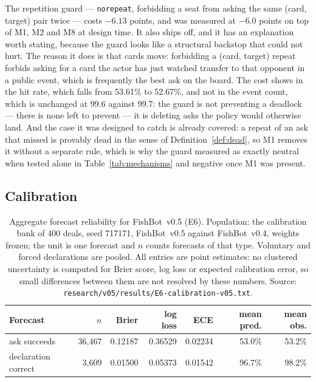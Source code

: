 \documentclass[11pt]{article}
\theoremstyle{definition}
\DeclareRobustCommand{\vfive}{\texorpdfstring{\mbox{FishBot v0.5}}{FishBot v0.5}}
\DeclareRobustCommand{\vfour}{\texorpdfstring{\mbox{FishBot v0.4}}{FishBot v0.4}}
\providecommand{\numCalibFiveDeals}{400}
\providecommand{\numCalibFiveSeed}{717171}
\providecommand{\numAblFullEvents}{99.7}
\providecommand{\numAblFullHit}{53.61}
\providecommand{\numAblRepeatGuardEvents}{99.6}
\providecommand{\numAblRepeatGuardHit}{52.67}
\providecommand{\numAblRepeatGuardDelta}{-6.13}
\providecommand{\numCalibAskBrier}{0.12187}
\providecommand{\numCalibAskECE}{0.02234}
\providecommand{\numCalibAskLogloss}{0.36529}
\providecommand{\numCalibAskN}{36{,}467}
\providecommand{\numCalibAskObs}{53.2}
\providecommand{\numCalibAskPred}{53.0}
\providecommand{\numCalibDeclBrier}{0.01500}
\providecommand{\numCalibDeclECE}{0.01542}
\providecommand{\numCalibDeclLogloss}{0.05373}
\providecommand{\numCalibDeclN}{3{,}609}
\providecommand{\numCalibDeclObs}{98.2}
\providecommand{\numCalibDeclPred}{96.7}
\providecommand{\numGuardReject}{6.0}
\begin{document}
The repetition guard --- \texttt{norepeat}, forbidding a seat from asking the same
(card, target) pair twice --- costs $\numAblRepeatGuardDelta$ points, and was
measured at $-\numGuardReject$ points on top of M1, M2 and M8 at design time. It
also ships off, and it has an explanation worth stating, because the guard looks
like a structural backstop that could not hurt. The reason it does is that cards
move: forbidding a (card, target) repeat forbids asking for a card the actor has
just watched transfer to that opponent in a public event, which is frequently the
best ask on the board. The cost shows in the hit rate, which falls from
\numAblFullHit\% to \numAblRepeatGuardHit\%, and not in the event count, which is
unchanged at \numAblRepeatGuardEvents{} against \numAblFullEvents{}: the guard is
not preventing a deadlock --- there is none left to prevent --- it is deleting
asks the policy would otherwise land. And the
case it was designed to catch is already covered: a repeat of an ask that missed
is provably dead in the sense of Definition~\ref{def:dead}, so M1 removes it
without a separate rule, which is why the guard measured as exactly neutral when
tested alone in Table~\ref{tab:mechanisms} and negative once M1 was present.

\subsection{Calibration}
\label{sec:results-calib}

\begin{table}[t]
\centering
\caption{Aggregate forecast reliability for \vfive{} (E6). Population: the
calibration bank of \numCalibFiveDeals{} deals, seed \numCalibFiveSeed{},
\vfive{} against \vfour{}, weights frozen; the unit is one forecast and $n$
counts forecasts of that type. Voluntary and forced declarations are pooled.
All entries are point estimates: no clustered uncertainty is computed for Brier
score, log loss or expected calibration error, so small differences between them
are not resolved by these numbers. Source:
\texttt{research/v05/results/E6-calibration-v05.txt}.}
\label{tab:calib-v05}
\small
\begin{tabular}{lrrrrrr}
\toprule
\textbf{Forecast} & \textbf{$n$} & \textbf{Brier} & \textbf{log loss}
  & \textbf{ECE} & \textbf{mean pred.} & \textbf{mean obs.} \\
\midrule
ask succeeds        & \numCalibAskN{}  & \numCalibAskBrier{}  & \numCalibAskLogloss{}  & \numCalibAskECE{}  & \numCalibAskPred\%  & \numCalibAskObs\% \\
declaration correct & \numCalibDeclN{} & \numCalibDeclBrier{} & \numCalibDeclLogloss{} & \numCalibDeclECE{} & \numCalibDeclPred\% & \numCalibDeclObs\% \\
\bottomrule
\end{tabular}
\end{table}
\end{document}
